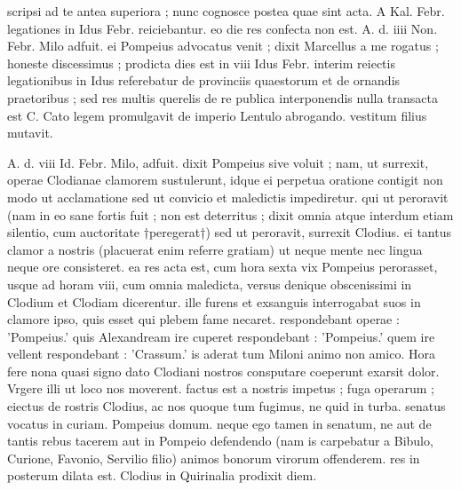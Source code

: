 


 scripsi ad te antea superiora ; nunc cognosce postea quae sint acta. A Kal. Febr. legationes in Idus Febr. reiciebantur. eo die res confecta non est. A. d. iiii Non. Febr. Milo adfuit. ei Pompeius advocatus venit ; dixit Marcellus a me rogatus ; honeste discessimus ; prodicta dies est in viii Idus Febr. interim reiectis legationibus in Idus referebatur de provinciis quaestorum et de ornandis praetoribus ; sed res multis querelis de re publica interponendis nulla transacta est C. Cato legem promulgavit de imperio Lentulo abrogando. vestitum filius mutavit.

 A. d. viii Id. Febr. Milo, adfuit. dixit Pompeius sive voluit ; nam, ut surrexit, operae Clodianae clamorem sustulerunt, idque ei perpetua oratione contigit non modo ut acclamatione sed ut convicio et maledictis impediretur. qui ut peroravit (nam in eo sane fortis fuit ; non est deterritus ; dixit omnia atque interdum etiam silentio, cum auctoritate †peregerat†) sed ut peroravit, surrexit Clodius. ei tantus clamor a nostris (placuerat enim referre gratiam) ut neque mente nec lingua neque ore consisteret. ea res acta est, cum hora sexta vix Pompeius perorasset, usque ad horam viii, cum omnia maledicta, versus denique obscenissimi in Clodium et Clodiam dicerentur. ille furens et exsanguis interrogabat suos in clamore ipso, quis esset qui plebem fame necaret. respondebant operae : 'Pompeius.' quis Alexandream ire cuperet respondebant : 'Pompeius.' quem ire vellent respondebant : 'Crassum.' is aderat tum Miloni animo non amico. Hora fere nona quasi signo dato Clodiani nostros consputare coeperunt exarsit dolor. Vrgere illi ut loco nos moverent. factus est a nostris impetus ; fuga operarum ; eiectus de rostris Clodius, ac nos quoque tum fugimus, ne quid in turba. senatus vocatus in curiam. Pompeius domum. neque ego tamen in senatum, ne aut de tantis rebus tacerem aut in Pompeio defendendo (nam is carpebatur a Bibulo, Curione, Favonio, Servilio filio) animos bonorum virorum offenderem. res in posterum dilata est. Clodius in Quirinalia prodixit diem.

